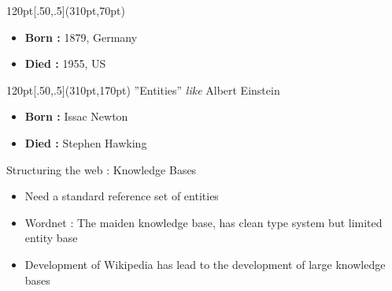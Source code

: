 \documentclass{beamer}
\begin{document}
\begin{frame}
\begin{textblock*}{120pt}[.50,.5](310pt,70pt)
\begin{itemize} 
\item \textbf{Born :} 1879, Germany
\item \textbf{Died :} 1955, US
 \end{itemize}

\end{textblock*}

\begin{textblock*}{120pt}[.50,.5](310pt,170pt)
''Entities'' \emph{like} Albert Einstein
\begin{itemize} 
\item \textbf{Born :} Issac Newton
\item \textbf{Died :} Stephen Hawking
 \end{itemize}
\end{textblock*}

\end{frame}


\begin{frame}{Structuring the web : Knowledge Bases}
\begin{itemize}
 \item Need a standard reference set of entities
 \item Wordnet : The maiden knowledge base, has clean type system but limited entity base
 \item Development of Wikipedia has lead to the development of large knowledge bases
\end{itemize}
\end{frame}
\end{document}
